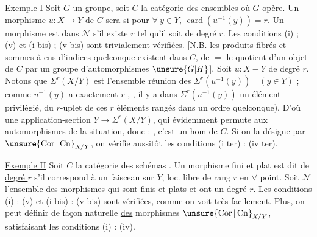 \uline{Exemple I} Soit $G$ un groupe, soit $C$ la catégorie des ensembles où $G$ opère. Un morphisme $u:X\longrightarrow Y$ de $C$ sera    si pour $\forall\ y\in Y$,   $\operatorname{card}(u^{-1}(y))=r$. Un morphisme est dans $\mathcal N$ s'il existe $r$ tel qu'il soit de degré $r$. Les conditions (i) ; (v) et (i bis) ; (v bis) sont trivialement vérifiées. [N.B. les produits fibrés et sommes à ens d'indices quelconque existent dans $C$,  de $=$ le quotient d'un objet de $C$ par un groupe d'automorphismes $\unsure{G|H}$]. Soit $u:X-Y$ de degré $r$. Notons que $\Sigma^r(X/Y)$ est l'ensemble   réunion des $\Sigma^r(u^{-1}(y))\quad(y\in Y)$ ; comme $u^{-1}(y)$ a exactement $r$ , ,  il y a dans $\Sigma^r(u^{-1}(y))$ un élément privilégié,  du $r$-uplet  de ces $r$ éléments rangés dans un ordre quelconque). D'où une application-section $Y\longrightarrow\Sigma^r(X/Y)$, qui évidemment permute aux automorphismes de la situation, donc : ,   c'est un  hom de $C$. Si on
la désigne par $\unsure{\operatorname{Cor}|\operatorname{Cn}}_{X/Y}$, on vérifie aussitôt les conditions (i ter) : (iv ter).


\uline{Exemple II} Soit $C$ la catégorie des schémas . Un morphisme fini et plat  est dit de \uline{degré $r$} s'il correspond à un  faisceau    sur $Y$, loc. libre de  rang $r$ en $\forall$ point. Soit $\mathcal N$ l'ensemble des morphismes qui sont finis et plats et ont un  degré $r$. Les conditions (i) : (v) et (i bis) : (v bis) sont vérifiées, comme on voit  très facilement.  Plus, on peut définir de façon naturelle \uline{des}  morphismes $\unsure{\operatorname{Cor}|\operatorname{Cn}}_{X/Y}$, satisfaisant les conditions (i) : (iv).


